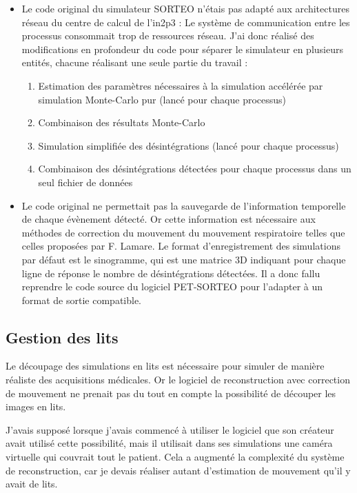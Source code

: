 \begin{itemize}
    \item Le code original du simulateur SORTEO n'étais pas adapté aux architectures réseau du centre de calcul de l'in2p3 : Le système de communication entre les processus consommait trop de ressources réseau. J'ai donc réalisé des modifications en profondeur du code pour séparer le simulateur en plusieurs entités, chacune réalisant une seule partie du travail :

    \begin{enumerate}
        \item Estimation des paramètres nécessaires à la simulation accélérée par simulation Monte-Carlo pur (lancé pour chaque processus)
        \item Combinaison des résultats Monte-Carlo
        \item Simulation simplifiée des désintégrations (lancé pour chaque processus)
        \item Combinaison des désintégrations détectées pour chaque processus dans un seul fichier de données
    \end{enumerate}

    \item Le code original ne permettait pas la sauvegarde de l'information temporelle de chaque évènement détecté. Or cette information est nécessaire aux méthodes de correction du mouvement du mouvement respiratoire telles que celles proposées par F. Lamare. Le format d'enregistrement des simulations par défaut est le sinogramme, qui est une matrice 3D indiquant pour chaque ligne de réponse le nombre de désintégrations détectées. Il a donc fallu reprendre le code source du logiciel PET-SORTEO pour l'adapter à un format de sortie compatible. 
\end{itemize}

\subsection{Gestion des lits}

Le découpage des simulations en lits est nécessaire pour simuler de manière réaliste des acquisitions médicales. Or le logiciel de reconstruction avec correction de mouvement ne prenait pas du tout en compte la possibilité de découper les images en lits. 

J'avais supposé lorsque j'avais commencé à utiliser le logiciel que son créateur avait utilisé cette possibilité, mais il utilisait dans ses simulations une caméra virtuelle qui couvrait tout le patient. Cela a augmenté la complexité du système de reconstruction, car je devais réaliser autant d'estimation de mouvement qu'il y avait de lits.


